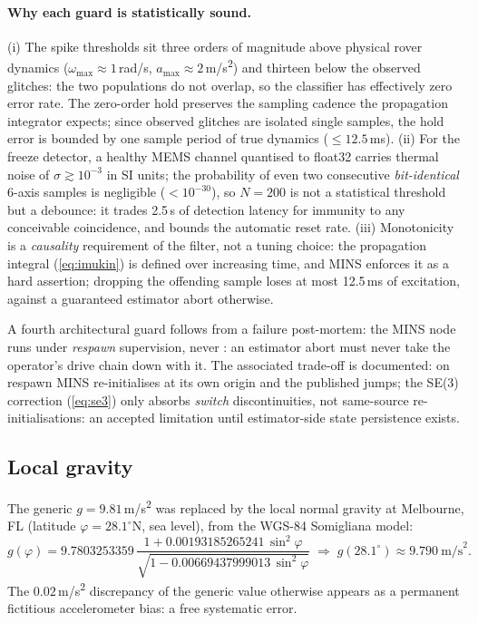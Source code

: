 \paragraph{Why each guard is statistically sound.}
(i) The spike thresholds sit three orders of magnitude above physical rover
dynamics ($\omega_{\max} \approx 1$\,rad/s, $a_{\max} \approx 2$\,m/s\textsuperscript{2})
and thirteen below the observed glitches: the two populations do not
overlap, so the classifier has effectively zero error rate. The zero-order
hold preserves the sampling cadence the propagation integrator expects; since
observed glitches are isolated single samples, the hold error is bounded by
one sample period of true dynamics ($\le 12.5$\,ms).
(ii) For the freeze detector, a healthy MEMS channel quantised to float32
carries thermal noise of $\sigma \gtrsim 10^{-3}$ in SI units; the
probability of even two consecutive \emph{bit-identical} 6-axis samples is
negligible ($< 10^{-30}$), so $N{=}200$ is not a statistical threshold but a
debounce: it trades 2.5\,s of detection latency for immunity to any
conceivable coincidence, and bounds the automatic reset rate.
(iii) Monotonicity is a \emph{causality} requirement of the filter, not a
tuning choice: the propagation integral (\ref{eq:imukin}) is defined over
increasing time, and MINS enforces it as a hard assertion; dropping the
offending sample loses at most 12.5\,ms of excitation, against a guaranteed
estimator abort otherwise.

A fourth architectural guard follows from a failure post-mortem: the MINS node
runs under \emph{respawn} supervision, never : an estimator
abort must never take the operator's drive chain down with it. The associated
trade-off is documented: on respawn MINS re-initialises at its own origin and
the published  jumps; the SE(3) correction
(\ref{eq:se3}) only absorbs \emph{switch} discontinuities, not same-source
re-initialisations: an accepted limitation until estimator-side state
persistence exists.

\subsection{Local gravity}
The generic $g = 9.81$\,m/s\textsuperscript{2} was replaced by the local
normal gravity at Melbourne, FL (latitude $\varphi = 28.1^\circ$N, sea
level), from the WGS-84 Somigliana model:
\begin{equation}
g(\varphi) = 9.7803253359\,
\frac{1 + 0.00193185265241\,\sin^2\varphi}
     {\sqrt{1 - 0.00669437999013\,\sin^2\varphi}}
\;\Rightarrow\; g(28.1^\circ) \approx 9.790\ \text{m/s}^2 .
\end{equation}
The $0.02$\,m/s\textsuperscript{2} discrepancy of the generic value otherwise
appears as a permanent fictitious accelerometer bias: a free systematic
error.


